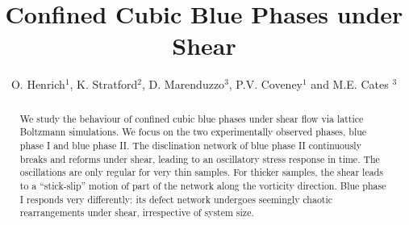 \documentclass[12pt,twoside]{iopart}
\begin{document}
\title[]{Confined Cubic Blue Phases under Shear}
\author{O. Henrich$^{1}$, K. Stratford$^2$, D. Marenduzzo$^3$, P.V. Coveney$^1$ and M.E. Cates $^3$}

\address{$^1$ Centre for Computational Science, Department of Chemistry,
University College London, WC1H 0AJ, United Kingdom\\
$^2$ Edinburgh Parallel Computing Centre and
$^3$ School of Physics and Astronomy, The King's Buildings,
The University of Edinburgh, EH9 3JZ, United Kingdom}

\begin{abstract}
We study the behaviour of confined cubic blue phases under shear flow
via lattice Boltzmann simulations. We focus on the two experimentally observed
phases, blue phase I and blue phase II. The disclination network of blue phase II continuously breaks and reforms under shear, 
leading to an oscillatory stress response in time. The oscillations are only regular for very thin samples. For thicker samples, the shear leads to a ``stick-slip'' motion
of part of the network along the vorticity direction.
Blue phase I responds very differently: its defect network undergoes seemingly
chaotic rearrangements under shear, irrespective of system size. 
\end{abstract}

\end{document}
